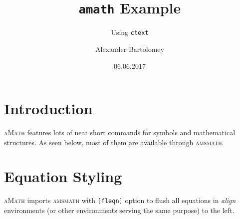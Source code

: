 \documentclass{ctext}
\title{\texttt{amath} Example}
\subtitle{Using \texttt{ctext}}
\author{Alexander Bartolomey}
\date{06.06.2017}
\begin{document}
\maketitle
\tableofcontents*
\section{Introduction}
\textsc{aMath} features lots of neat short commands for symbols and mathematical structures. As seen below, most of them are available through \textsc{amsmath}.
\section{Equation Styling}
\textsc{aMath} imports \textsc{amsmath} with \verb|[fleqn]| option to flush all equations in \emph{align} environments (or other environments serving the same purpose) to the left.
\end{document}
